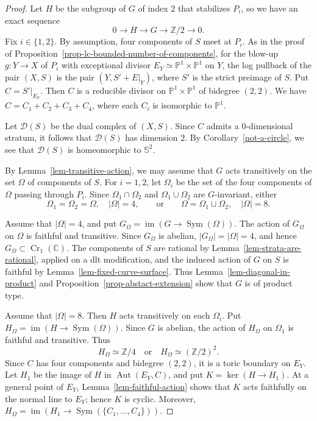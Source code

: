 \documentclass[11pt]{amsart}
\numberwithin{equation}{section}
\theoremstyle{definition}
\theoremstyle{remark}
\newcommand{\lra}{\longrightarrow}
\DeclareMathOperator{\Cr}{Cr}
\DeclareMathOperator{\Aut}{Aut}
\begin{document}
\begin{proof}
Let $H$ be the subgroup of $G$ of index $2$ that stabilizes $P_i$, so we have an exact sequence
\begin{equation}
\label{eq-last-sequence}
0\lra H \lra G\lra \mathbb{Z}/2 \lra 0. 
\end{equation}
Fix $i\in\{1,2\}$. By assumption, four components of $S$ meet at $P_i$.
As in the proof of Proposition~\ref{prop-lc-bounded-number-of-components}, for the blow-up $g\colon Y\to X$ of $P_i$ with exceptional divisor $E_Y\simeq \mathbb{P}^1\times\mathbb{P}^1$ on $Y$, the log pullback of the pair $(X, S)$ is the pair $(Y, S' + E|_Y)$, where $S'$ is the strict preimage of $S$. 
Put $C=S'|_{E_Y}$. Then ${C}$ is a reducible divisor on $\mathbb{P}^1\times\mathbb{P}^1$ of bidegree $(2,2)$. 
We have ${C}=C_1+C_2+C_3+C_4$, where each $C_i$ is isomorphic to $\mathbb{P}^1$.

Let $\mathcal{D}(S)$ be the dual complex of $(X,S)$. 
Since ${C}$ admits a $0$-dimensional stratum, it follows that $\mathcal{D}(S)$ has dimension $2$. By Corollary~\ref{not-a-circle}, we see that $\mathcal{D}(S)$ is homeomorphic to $\mathbb{S}^2$. 

By Lemma~\ref{lem-transitive-action}, we may assume that $G$ acts transitively on the set $\Omega$ of components of $S$. For $i=1,2$, let $\Omega_i$ be the set of the four components of $\Omega$ passing through $P_i$. Since $\Omega_1\cap\Omega_2$ and $\Omega_1\cup\Omega_2$ are $G$-invariant, either
\[
\Omega_1=\Omega_2=\Omega,\quad |\Omega|=4,
\qquad\text{or}\qquad
\Omega=\Omega_1\sqcup\Omega_2,\quad |\Omega|=8.
\]

Assume that $|\Omega|=4$, and put $G_\Omega=\operatorname{im}(G\to\operatorname{Sym}(\Omega))$. The action of $G_\Omega$ on $\Omega$ is faithful and transitive. Since $G_\Omega$ is abelian, $|G_\Omega|=|\Omega|=4$, and hence $G_\Omega\subset\Cr_1(\mathbb C)$. The components of $S$ are rational by Lemma~\ref{lem-strata-are-rational}, applied on a dlt modification, and the induced action of $G$ on $S$ is faithful by Lemma~\ref{lem-fixed-curve-surface}. Thus Lemma~\ref{lem-diagonal-in-product} and Proposition~\ref{prop-abstact-extension} show that $G$ is of product type.

Assume that $|\Omega|=8$. Then $H$ acts transitively on each $\Omega_i$. Put $H_\Omega=\operatorname{im}(H\to\operatorname{Sym}(\Omega))$. Since $G$ is abelian, the action of $H_\Omega$ on $\Omega_1$ is faithful and transitive. Thus
\[
H_\Omega\simeq\mathbb Z/4
\quad\text{or}\quad
H_\Omega\simeq(\mathbb Z/2)^2.
\]
Since $C$ has four components and bidegree $(2,2)$, it is a toric boundary on $E_Y$. Let $H_1$ be the image of $H$ in $\Aut(E_Y,C)$, and put $K=\ker(H\to H_1)$. At a general point of $E_Y$, Lemma~\ref{lem-faithful-action} shows that $K$ acts faithfully on the normal line to $E_Y$; hence $K$ is cyclic. Moreover, $H_\Omega=\operatorname{im}(H_1\to\operatorname{Sym}(\{C_1,\ldots,C_4\}))$.


\end{proof}
\end{document}
